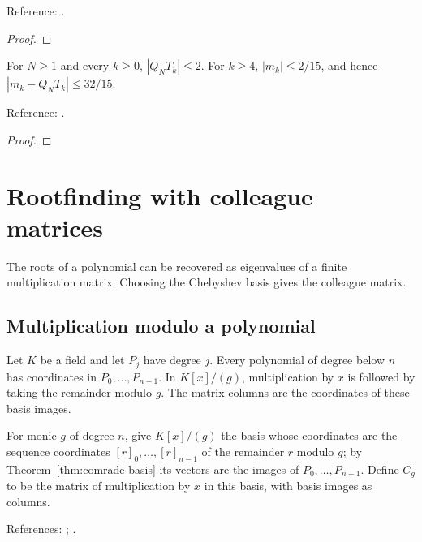 \begin{supporting}
\begin{theorem}
Reference: \cite[Chapters 4 and 19]{atap}.
\end{theorem}
\begin{proof}
\leanok
\end{proof}

\begin{theorem}
\label{thm:cc-mode-error}
\leanok
For $N\ge1$ and every $k\ge0$, $|Q_NT_k|\le2$.
For $k\ge4$, $|m_k|\le2/15$, and hence
$|m_k-Q_NT_k|\le32/15$.

Reference: \cite[proof of Theorem 19.3]{atap}.
\end{theorem}
\begin{proof}
\leanok
\end{proof}

\end{supporting}

\chapter{Rootfinding with colleague matrices}\label{chap:roots}


The roots of a polynomial can be recovered as eigenvalues of a finite multiplication matrix. Choosing the Chebyshev basis gives the colleague matrix.

\section{Multiplication modulo a polynomial}\label{sec:textbook-roots-construction}

Let $K$ be a field and let $P_j$ have degree $j$. Every polynomial of degree below $n$ has coordinates in $P_0,\ldots,P_{n-1}$. In $K[x]/(g)$, multiplication by $x$ is followed by taking the remainder modulo $g$. The matrix columns are the coordinates of these basis images.

\begin{definition}
\label{def:comrade-matrix}
\leanok
For monic $g$ of degree $n$, give $K[x]/(g)$ the basis whose coordinates are
the sequence coordinates $[r]_0,\ldots,[r]_{n-1}$ of the remainder $r$ modulo
$g$; by Theorem~\ref{thm:comrade-basis} its vectors are the images of
$P_0,\ldots,P_{n-1}$. Define $C_g$ to be the matrix of multiplication by $x$ in
this basis, with basis images as columns.

References: \cite{barnett-comrade}; \cite[Chapter 18]{atap}.
\end{definition}

